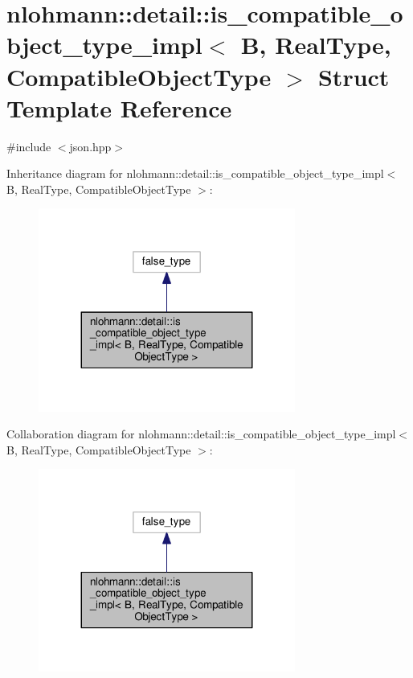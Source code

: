 \hypertarget{structnlohmann_1_1detail_1_1is__compatible__object__type__impl}{}\section{nlohmann\+:\+:detail\+:\+:is\+\_\+compatible\+\_\+object\+\_\+type\+\_\+impl$<$ B, Real\+Type, Compatible\+Object\+Type $>$ Struct Template Reference}
\label{structnlohmann_1_1detail_1_1is__compatible__object__type__impl}


{\ttfamily \#include $<$json.\+hpp$>$}



Inheritance diagram for nlohmann\+:\+:detail\+:\+:is\+\_\+compatible\+\_\+object\+\_\+type\+\_\+impl$<$ B, Real\+Type, Compatible\+Object\+Type $>$\+:\nopagebreak
\begin{figure}[H]
\begin{center}
\leavevmode
\includegraphics[width=239pt]{structnlohmann_1_1detail_1_1is__compatible__object__type__impl__inherit__graph}
\end{center}
\end{figure}


Collaboration diagram for nlohmann\+:\+:detail\+:\+:is\+\_\+compatible\+\_\+object\+\_\+type\+\_\+impl$<$ B, Real\+Type, Compatible\+Object\+Type $>$\+:\nopagebreak
\begin{figure}[H]
\begin{center}
\leavevmode
\includegraphics[width=239pt]{structnlohmann_1_1detail_1_1is__compatible__object__type__impl__coll__graph}
\end{center}
\end{figure}


